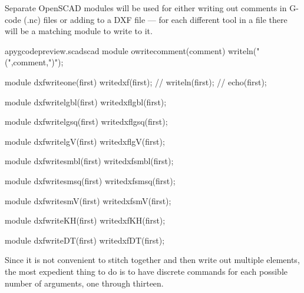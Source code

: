 \documentclass{ltxdoc}
\begin{document}
%
%
%
Separate OpenSCAD modules will be used for either writing out comments in G-code (.nc) files
or adding to a DXF file --- for each different tool in a file there will be a matching
module to write to it.
 
\lstset{firstnumber=\thepyscad}
\begin{writecode}{a}{pygcodepreview.scad}{scad}
module owritecomment(comment) {
    writeln("(",comment,")");
}

module dxfwriteone(first) {
    writedxf(first);
//    writeln(first);
//    echo(first);
}

module dxfwritelgbl(first) {
    writedxflgbl(first);
}

module dxfwritelgsq(first) {
    writedxflgsq(first);
}

module dxfwritelgV(first) {
    writedxflgV(first);
}

module dxfwritesmbl(first) {
    writedxfsmbl(first);
}

module dxfwritesmsq(first) {
    writedxfsmsq(first);
}

module dxfwritesmV(first) {
    writedxfsmV(first);
}

module dxfwriteKH(first) {
    writedxfKH(first);
}

module dxfwriteDT(first) {
    writedxfDT(first);
}

\end{writecode}
\addtocounter{pyscad}{42}
%

Since it is not convenient to stitch together and then write out multiple elements,
the most expedient thing to do is to have discrete commands for each possible number
of arguments, one through thirteen.
 
\end{document}
